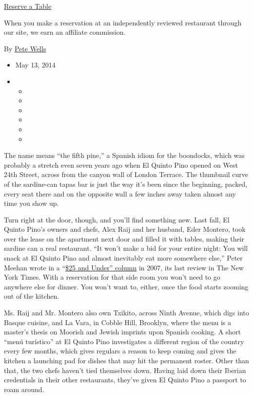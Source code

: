 \href{http://www.opentable.com/single.aspx?ref=4201\&rid=148285}{Reserve
a Table}

When you make a reservation at an independently reviewed restaurant
through our site, we earn an affiliate commission.

By \href{http://www.nytimes3xbfgragh.onion/by/pete-wells}{Pete Wells}

\begin{itemize}
\item
  May 13, 2014
\item
  \begin{itemize}
  \item
  \item
  \item
  \item
  \item
  \item
  \end{itemize}
\end{itemize}

The name means ``the fifth pine,'' a Spanish idiom for the boondocks,
which was probably a stretch even seven years ago when El Quinto Pino
opened on West 24th Street, across from the canyon wall of London
Terrace. The thumbnail curve of the sardine-can tapas bar is just the
way it's been since the beginning, packed, every seat there and on the
opposite wall a few inches away taken almost any time you show up.

Turn right at the door, though, and you'll find something new. Last
fall, El Quinto Pino's owners and chefs, Alex Raij and her husband, Eder
Montero, took over the lease on the apartment next door and filled it
with tables, making their sardine can a real restaurant. ``It won't make
a bid for your entire night: You will snack at El Quinto Pino and almost
inevitably eat more somewhere else,'' Peter Meehan wrote in a
``\href{http://events.nytimes3xbfgragh.onion/2007/10/31/dining/reviews/31unde.html?_r=0}{\$25
and Under'' column} in 2007, its last review in The New York Times. With
a reservation for that side room you won't need to go anywhere else for
dinner. You won't want to, either, once the food starts zooming out of
the kitchen.

Ms. Raij and Mr. Montero also own Txikito, across Ninth Avenue, which
digs into Basque cuisine, and La Vara, in Cobble Hill, Brooklyn, where
the menu is a master's thesis on Moorish and Jewish imprints upon
Spanish cooking. A short ``menú turístico'' at El Quinto Pino
investigates a different region of the country every few months, which
gives regulars a reason to keep coming and gives the kitchen a launching
pad for dishes that may hit the permanent roster. Other than that, the
two chefs haven't tied themselves down. Having laid down their Iberian
credentials in their other restaurants, they've given El Quinto Pino a
passport to roam around.

